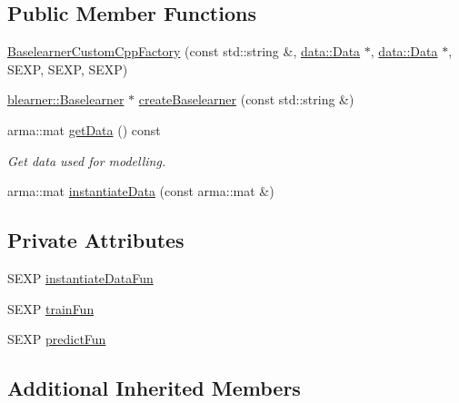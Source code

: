 \subsection*{Public Member Functions}
\begin{DoxyCompactItemize}
\item 
\mbox{\hyperlink{classblearnerfactory_1_1_baselearner_custom_cpp_factory_aede05893f296f7cc4fa07b0601a426e8}{Baselearner\+Custom\+Cpp\+Factory}} (const std\+::string \&, \mbox{\hyperlink{classdata_1_1_data}{data\+::\+Data}} $\ast$, \mbox{\hyperlink{classdata_1_1_data}{data\+::\+Data}} $\ast$, S\+E\+XP, S\+E\+XP, S\+E\+XP)
\item 
\mbox{\hyperlink{classblearner_1_1_baselearner}{blearner\+::\+Baselearner}} $\ast$ \mbox{\hyperlink{classblearnerfactory_1_1_baselearner_custom_cpp_factory_a1754f789953cc9d12f7cdd861772d13b}{create\+Baselearner}} (const std\+::string \&)
\item 
arma\+::mat \mbox{\hyperlink{classblearnerfactory_1_1_baselearner_custom_cpp_factory_af11e8ca40f235632dba38ed3849f7606}{get\+Data}} () const
\begin{DoxyCompactList}\small\item\em Get data used for modelling. \end{DoxyCompactList}\item 
arma\+::mat \mbox{\hyperlink{classblearnerfactory_1_1_baselearner_custom_cpp_factory_a1e7c75381ec018b38efa021ba4dd475f}{instantiate\+Data}} (const arma\+::mat \&)
\end{DoxyCompactItemize}
\subsection*{Private Attributes}
\begin{DoxyCompactItemize}
\item 
S\+E\+XP \mbox{\hyperlink{classblearnerfactory_1_1_baselearner_custom_cpp_factory_ac8e871bd70f1f560ed8fcab5556c97f0}{instantiate\+Data\+Fun}}
\item 
S\+E\+XP \mbox{\hyperlink{classblearnerfactory_1_1_baselearner_custom_cpp_factory_a8b36c04fdd1532ee53a1970f35641c05}{train\+Fun}}
\item 
S\+E\+XP \mbox{\hyperlink{classblearnerfactory_1_1_baselearner_custom_cpp_factory_a5238c8eedc4bfd58e9449b9a7e51c8aa}{predict\+Fun}}
\end{DoxyCompactItemize}
\subsection*{Additional Inherited Members}


